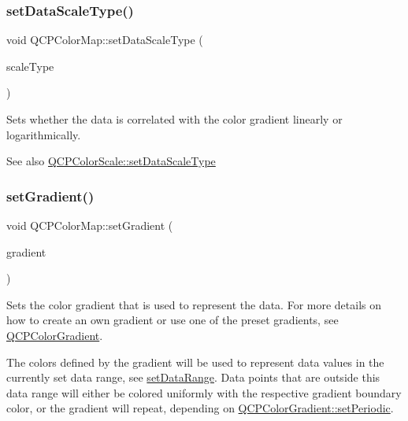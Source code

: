 \subsubsection{\texorpdfstring{set\+Data\+Scale\+Type()}{setDataScaleType()}}
{\footnotesize\ttfamily void Q\+C\+P\+Color\+Map\+::set\+Data\+Scale\+Type (\begin{DoxyParamCaption}\item[{\hyperlink{class_q_c_p_axis_a36d8e8658dbaa179bf2aeb973db2d6f0}{Q\+C\+P\+Axis\+::\+Scale\+Type}}]{scale\+Type }\end{DoxyParamCaption})}

Sets whether the data is correlated with the color gradient linearly or logarithmically.

\begin{DoxySeeAlso}{See also}
\hyperlink{class_q_c_p_color_scale_aeb6107d67dd7325145b2498abae67fc3}{Q\+C\+P\+Color\+Scale\+::set\+Data\+Scale\+Type} 
\end{DoxySeeAlso}
\hypertarget{class_q_c_p_color_map_a7313c78360471cead3576341a2c50377}{}\label{class_q_c_p_color_map_a7313c78360471cead3576341a2c50377} 
\subsubsection{\texorpdfstring{set\+Gradient()}{setGradient()}}
{\footnotesize\ttfamily void Q\+C\+P\+Color\+Map\+::set\+Gradient (\begin{DoxyParamCaption}\item[{const \hyperlink{class_q_c_p_color_gradient}{Q\+C\+P\+Color\+Gradient} \&}]{gradient }\end{DoxyParamCaption})}

Sets the color gradient that is used to represent the data. For more details on how to create an own gradient or use one of the preset gradients, see \hyperlink{class_q_c_p_color_gradient}{Q\+C\+P\+Color\+Gradient}.

The colors defined by the gradient will be used to represent data values in the currently set data range, see \hyperlink{class_q_c_p_color_map_a980b42837821159786a85b4b7dcb8774}{set\+Data\+Range}. Data points that are outside this data range will either be colored uniformly with the respective gradient boundary color, or the gradient will repeat, depending on \hyperlink{class_q_c_p_color_gradient_a39d6448155fc00a219f239220d14bb39}{Q\+C\+P\+Color\+Gradient\+::set\+Periodic}.


